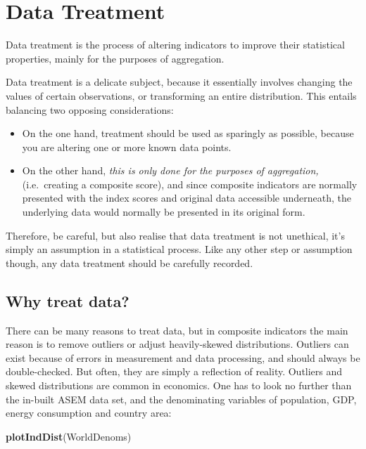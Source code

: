 \documentclass[
]{book}
\newenvironment{Shaded}{\begin{snugshade}}{\end{snugshade}}
\newcommand{\KeywordTok}[1]{\textcolor[rgb]{0.13,0.29,0.53}{\textbf{#1}}}
\newcommand{\NormalTok}[1]{#1}
\providecommand{\tightlist}{%
  \setlength{\itemsep}{0pt}\setlength{\parskip}{0pt}}
\begin{document}
\hypertarget{data-treatment}{%
\chapter{Data Treatment}\label{data-treatment}}

Data treatment is the process of altering indicators to improve their statistical properties, mainly for the purposes of aggregation.

Data treatment is a delicate subject, because it essentially involves changing the values of certain observations, or transforming an entire distribution. This entails balancing two opposing considerations:

\begin{itemize}
\tightlist
\item
  On the one hand, treatment should be used as sparingly as possible, because you are altering one or more known data points.
\item
  On the other hand, \emph{this is only done for the purposes of aggregation,} (i.e.~creating a composite score), and since composite indicators are normally presented with the index scores and original data accessible underneath, the underlying data would normally be presented in its original form.
\end{itemize}

Therefore, be careful, but also realise that data treatment is not unethical, it's simply an assumption in a statistical process. Like any other step or assumption though, any data treatment should be carefully recorded.

\hypertarget{why-treat-data}{%
\section{Why treat data?}\label{why-treat-data}}

There can be many reasons to treat data, but in composite indicators the main reason is to remove outliers or adjust heavily-skewed distributions. Outliers can exist because of errors in measurement and data processing, and should always be double-checked. But often, they are simply a reflection of reality. Outliers and skewed distributions are common in economics. One has to look no further than the in-built ASEM data set, and the denominating variables of population, GDP, energy consumption and country area:

\begin{Shaded}
\begin{Highlighting}[]
\KeywordTok{plotIndDist}\NormalTok{(WorldDenoms)}
\end{Highlighting}
\end{Shaded}
\end{document}
